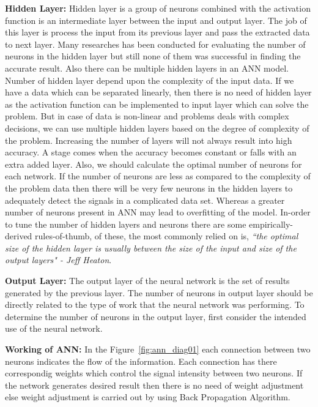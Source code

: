 \textbf{Hidden Layer:} Hidden layer is a group of neurons combined with the activation function\cite{activation_function} is an intermediate layer between the input and output layer. The job of this layer is process the input from its previous layer and pass the extracted data to next layer. Many researches has been conducted for evaluating the number of neurons in the hidden layer but still none of them was successful in finding the accurate result. Also there can be multiple hidden layers in an ANN model. Number of hidden layer depend upon the complexity of the input data. If we have a data which can be separated linearly, then there is no need of hidden layer as the activation function can be implemented to input layer which can solve the problem. But in case of data is non-linear and problems deals with complex decisions, we can use multiple hidden layers based on the degree of complexity of the problem. Increasing the number of layers will not always result into high accuracy. A stage comes when the accuracy becomes constant or falls with an extra added layer.
Also, we should calculate the optimal number of neurons for each network. If the number of neurons are less as compared to the complexity of the problem data then there will be very few neurons in the hidden layers to adequately detect the signals in a complicated data set. Whereas a greater number of neurons present in ANN may lead to overfitting of the model. In-order to tune the number of hidden layers and neurons there are some empirically-derived rules-of-thumb, of these, the most commonly relied on is, \textit{``the optimal size of the hidden layer is usually between the size of the input and size of the output layers" - Jeff Heaton}\cite{heaton2008introduction}.

\textbf{Output Layer:} The output layer of the neural network is the set of results generated by the previous layer. The number of neurons in output layer should be directly related to the type of work that the neural network was performing. To determine the number of neurons in the output layer, first consider the intended use of the neural network. 

\textbf{Working of ANN:} In the Figure~\ref{fig:ann_diag01} each connection between two neurons indicates the flow of the information. Each connection has there correspondig weights which control the signal intensity between two neurons. If the network generates desired result then there is no need of weight adjustment else weight adjustment is carried out by using Back Propagation Algorithm.


